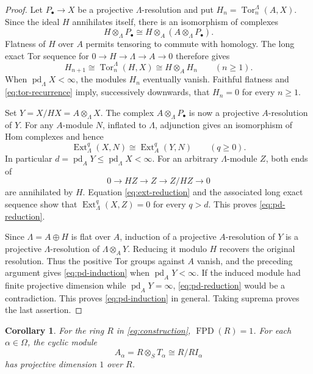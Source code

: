 \documentclass[11pt]{amsart}
\newtheorem{corollary}[theorem]{Corollary}
\theoremstyle{definition}
\DeclareMathOperator{\FPD}{FPD}
\DeclareMathOperator{\pd}{pd}
\DeclareMathOperator{\Ext}{Ext}
\DeclareMathOperator{\Tor}{Tor}
\numberwithin{equation}{section}
\begin{document}
\begin{proof}
Let $P_\bullet\to X$ be a projective $\Lambda$-resolution and put
$H_n=\Tor_n^\Lambda(A,X)$. Since the ideal $H$ annihilates itself,
there is an isomorphism of complexes
\[
 H\otimes_\Lambda P_\bullet
   \cong H\otimes_A(A\otimes_\Lambda P_\bullet).
\]
Flatness of $H$ over $A$ permits tensoring to commute with homology.
The long exact Tor sequence for $0\to H\to\Lambda\to A\to0$
therefore gives
\begin{equation}\label{eq:tor-recurrence}
 H_{n+1}\cong\Tor_n^\Lambda(H,X)\cong H\otimes_A H_n
       \qquad(n\geq1).
\end{equation}
When $\pd_\Lambda X<\infty$, the modules $H_n$ eventually vanish.
Faithful flatness and \eqref{eq:tor-recurrence} imply, successively
downwards, that $H_n=0$ for every $n\geq1$.

Set $Y=X/HX=A\otimes_\Lambda X$. The complex
$A\otimes_\Lambda P_\bullet$ is now a projective $A$-resolution of
$Y$. For any $A$-module $N$, inflated to $\Lambda$, adjunction gives
an isomorphism of Hom complexes and hence
\begin{equation}\label{eq:ext-reduction}
 \Ext_\Lambda^q(X,N)\cong\Ext_A^q(Y,N)
       \qquad(q\geq0).
\end{equation}
In particular $d=\pd_A Y\leq\pd_\Lambda X<\infty$.
For an arbitrary $\Lambda$-module $Z$, both ends of
\[
 0\longrightarrow HZ\longrightarrow Z\longrightarrow Z/HZ
   \longrightarrow0
\]
are annihilated by $H$. Equation \eqref{eq:ext-reduction} and the
associated long exact sequence show that $\Ext_\Lambda^q(X,Z)=0$
for every $q>d$. This proves \eqref{eq:pd-reduction}.

Since $\Lambda=A\oplus H$ is flat over $A$, induction of a
projective $A$-resolution of $Y$ is a projective $\Lambda$-resolution
of $\Lambda\otimes_A Y$. Reducing it modulo $H$ recovers the original
resolution. Thus the positive Tor groups against $A$ vanish, and
the preceding argument gives \eqref{eq:pd-induction} when
$\pd_A Y<\infty$. If the induced module had finite projective
dimension while $\pd_A Y=\infty$, \eqref{eq:pd-reduction} would be
a contradiction. This proves \eqref{eq:pd-induction} in general.
Taking suprema proves the last assertion.
\end{proof}

\begin{corollary}\label{cor:fpd}
For the ring $R$ in \eqref{eq:construction}, $\FPD(R)=1$.
For each $\alpha\in\Omega$, the cyclic module
\begin{equation}\label{eq:Aalpha}
 A_\alpha=R\otimes_S T_\alpha\cong R/RI_\alpha
\end{equation}
has projective dimension $1$ over $R$.
\end{corollary}
\end{document}
